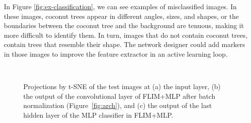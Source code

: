  In Figure \ref{fig:ex-classification}, we can see examples of misclassified images. In these images, coconut trees appear in different angles, sizes, and shapes, or the boundaries between the coconut tree and the background are tenuous, making it more difficult to identify them. In turn, images that do not contain coconut trees, contain trees that resemble their shape. The network designer could add markers in those images to improve the feature extractor in an active learning loop.

\begin{figure}
  \centering
  ~
  ~
  \caption{Projections by t-SNE of the test images at (a) the input layer, (b) the output of the convolutional layer of  FLIM+MLP after batch normalization (Figure~\ref{fig:arch}), and (c) the output of the last hidden layer of the MLP classifier in  FLIM+MLP.}
\end{figure}

